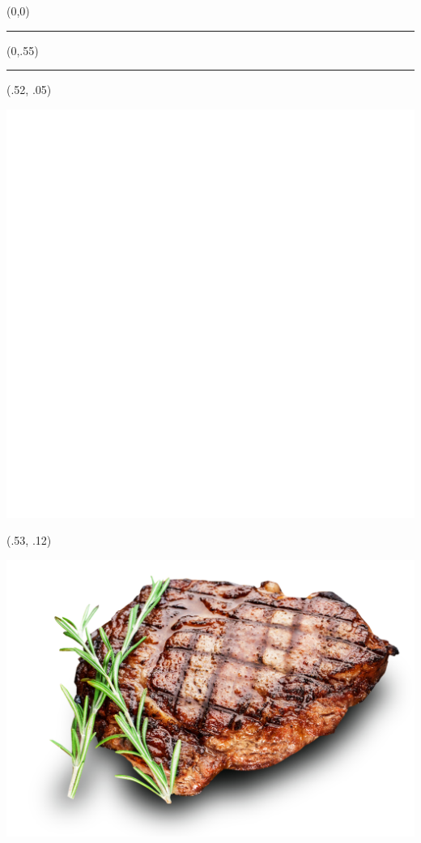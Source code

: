 \pagestyle{empty}

\begin{textblock}{1}(0,0)
    \noindent\textcolor{plop}{\rule{\paperwidth}{.55\paperheight}}
\end{textblock}

\begin{textblock}{1}(0,.55)
    \noindent\textcolor{black}{\rule{\paperwidth}{.45\paperheight}}
\end{textblock}

\begin{textblock}{.45}(.52, .05)
    \begin{center}
        \includegraphics[width=.4\paperwidth]{logo2.png}
    \end{center}
\end{textblock}

\begin{textblock}{.45}(.53, .12)
    \begin{center}
        \includegraphics[width=.4\paperwidth]{logo.png}
    \end{center}
\end{textblock}


